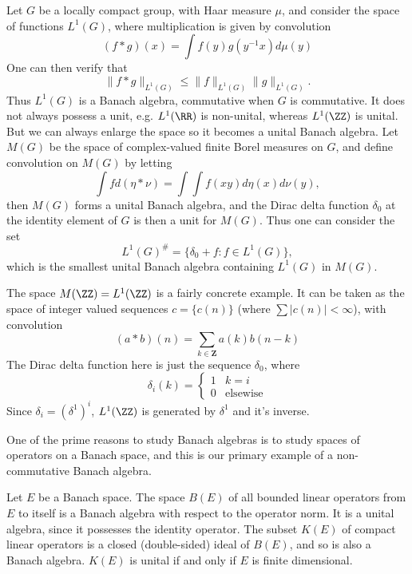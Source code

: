 \begin{example}
    Let $G$ be a locally compact group, with Haar measure $\mu$, and consider the space of functions $L^1(G)$, where multiplication is given by convolution
    \[ (f * g)(x) = \int f(y) g(y^{-1}x) d\mu(y) \]
    One can then verify that
    \[ \| f * g \|_{L^1(G)} \leq \| f \|_{L^1(G)} \| g \|_{L^1(G)}. \]
    Thus $L^1(G)$ is a Banach algebra, commutative when $G$ is commutative. It does not always possess a unit, e.g. $L^1(\RR)$ is non-unital, whereas $L^1(\ZZ)$ is unital. But we can always enlarge the space so it becomes a unital Banach algebra. Let $M(G)$ be the space of complex-valued finite Borel measures on $G$, and define convolution on $M(G)$ by letting
    \[ \int f d (\eta * \nu) = \int \int f(xy) d\eta(x) d\nu(y), \]
    then $M(G)$ forms a unital Banach algebra, and the Dirac delta function $\delta_0$ at the identity element of $G$ is then a unit for $M(G)$. Thus one can consider the set
    \[ L^1(G)^\# = \{ \delta_0 + f : f \in L^1(G) \}, \]
    which is the smallest unital Banach algebra containing $L^1(G)$ in $M(G)$.

    The space $M(\ZZ) = L^1(\ZZ)$ is a fairly concrete example. It can be taken as the space of integer valued sequences $c = \{ c(n) \}$ (where $\sum |c(n)| < \infty$), with convolution
    \[ (a * b)(n) = \sum_{k \in \mathbf{Z}} a(k) b(n-k) \]
    The Dirac delta function here is just the sequence $\delta_0$, where
    \[ \delta_i(k) = \begin{cases} 1 & k = i \\ 0 & \text{elsewise} \end{cases} \]
    Since $\delta_i = (\delta^1)^i$, $L^1(\ZZ)$ is generated by $\delta^1$ and it's inverse.
\end{example}

One of the prime reasons to study Banach algebras is to study spaces of operators on a Banach space, and this is our primary example of a non-commutative Banach algebra.

\begin{example}
    Let $E$ be a Banach space. The space $B(E)$ of all bounded linear operators from $E$ to itself is a Banach algebra with respect to the operator norm. It is a unital algebra, since it possesses the identity operator. The subset $K(E)$ of compact linear operators is a closed (double-sided) ideal of $B(E)$, and so is also a Banach algebra. $K(E)$ is unital if and only if $E$ is finite dimensional.
\end{example}


